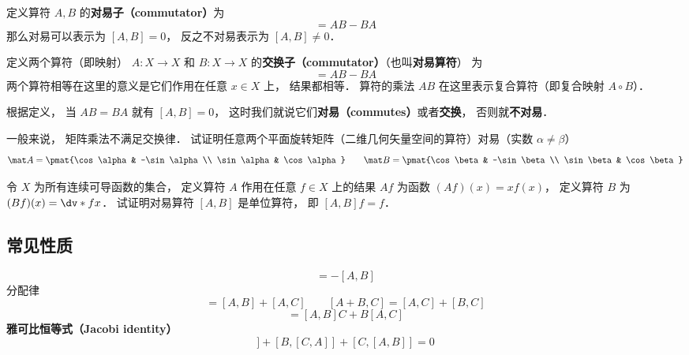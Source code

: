 
定义算符 $A,B$ 的\textbf{对易子（commutator）}为
\begin{equation}
[A, B] = AB - BA
\end{equation}
那么对易可以表示为 $[A,B] = 0$， 反之不对易表示为 $[A,B]\ne 0$．



定义两个算符（即映射） $A: X\to X$ 和 $B: X\to X$ 的\textbf{交换子（commutator）}（也叫\textbf{对易算符}） 为
\begin{equation}
[A, B] = A B - B A
\end{equation}
两个算符相等在这里的意义是它们作用在任意 $x \in X$ 上， 结果都相等． 算符的乘法 $AB$ 在这里表示复合算符（即复合映射 $A\circ B$）．

根据定义， 当 $A B = B A$ 就有 $[A, B] = 0$， 这时我们就说它们\textbf{对易（commutes）}或者\textbf{交换}， 否则就\textbf{不对易}．

\begin{exercise}{}
一般来说， 矩阵乘法不满足交换律． 试证明任意两个平面旋转矩阵（二维几何矢量空间的算符）对易（实数 $\alpha \ne \beta$）
\begin{equation}
\mat A  = \pmat{\cos\alpha & -\sin\alpha\\ \sin\alpha & \cos\alpha}
\qquad
\mat B  = \pmat{\cos\beta & -\sin\beta\\ \sin\beta & \cos\beta}
\end{equation}
\end{exercise}

\begin{exercise}{}
令 $X$ 为所有连续可导函数的集合， 定义算符 $A$ 作用在任意 $f\in X$ 上的结果 $Af$ 为函数 $(Af)(x) = x f(x)$， 定义算符 $B$ 为 $(Bf)(x) = \dv*{f}{x}$． 试证明对易算符 $[A, B]$ 是单位算符， 即 $[A, B]f = f$．
\end{exercise}

\subsection{常见性质}
\begin{equation}
[B, A] = -[A, B]
\end{equation}
分配律
\begin{equation}
[A, B + C] = [A, B] + [A, C]
\qquad
[A + B, C] = [A, C] + [B, C]
\end{equation}
\begin{equation}
[A, BC] = [A, B]C + B[A, C]
\end{equation}
\textbf{雅可比恒等式（Jacobi identity）}
\begin{equation}
[A, [B, C]] + [B, [C, A]] + [C, [A, B]] = 0
\end{equation}
